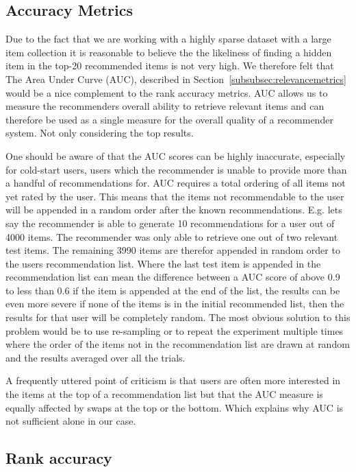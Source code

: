\subsection{Accuracy Metrics}

Due to the fact that we are working with a highly sparse dataset with a large item collection
it is reasonable to believe the the likeliness of finding a hidden item in the top-20 recommended items
is not very high. We therefore felt that The Area Under Curve (AUC), described in Section~\ref{subsubsec:relevancemetrics}
would be a nice complement to the rank accuracy metrics. AUC allows us to measure the recommenders overall
ability to retrieve relevant items and can therefore be used as a single measure for the overall quality of a recommender
system. Not only considering the top results.

One should be aware of that the AUC scores can be highly inaccurate, especially for cold-start users,
users which the recommender is unable to provide more than a handful of recommendations for. AUC requires
a total ordering of all items not yet rated by the user. This means that the items not recommendable
to the user will be appended in a random order after the known recommendations.
E.g. lets say the recommender is able to generate 10 recommendations for a user out of 4000 items.
The recommender was only able to retrieve one out of two relevant test items. The remaining 3990
items are therefor appended in random order to the users recommendation list. Where the last test item is
appended in the recommendation list can mean the difference between a AUC score of above
0.9 to less than 0.6 if the item is appended at the end of the list, the results can be even more
severe if none of the items is in the initial recommended list, then the results for that user will be
completely random. The most obvious solution to this problem would be to use re-sampling or to repeat
the experiment multiple times where the order of the items not in the recommendation list are drawn at random and
the results averaged over all the trials.

A frequently uttered point of criticism is that users are often more interested in the items
at the top of a recommendation list but that the AUC measure is equally affected by swaps at the top
or the bottom. Which explains why AUC is not sufficient alone in our case.

\subsection{Rank accuracy}

